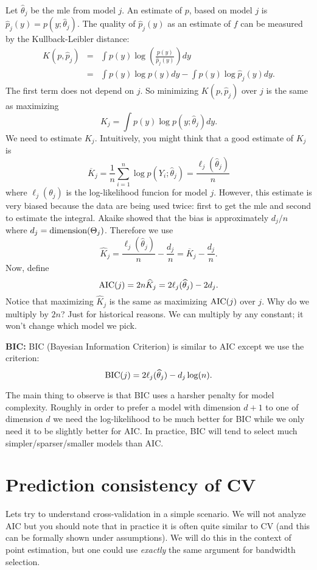 \documentclass[twoside,12pt]{article}
\begin{document}
Let $\widehat\theta_j$ be the mle from model $j$.
An estimate of $p$, based on model $j$ is
$\widehat p_j(y) = p(y;\widehat\theta_j)$.
The quality of
$\widehat p_j(y)$ as an estimate of $f$ can be measured 
by the Kullback-Leibler distance:
\begin{eqnarray*}
K(p,\widehat{p}_j) &=& \int p(y) \log \left( \frac{p(y)}{\widehat p_j(y)}\right) dy\\
&=& \int p(y) \log p(y) dy - \int p(y) \log \widehat p_j(y)  dy.
\end{eqnarray*}
The first term does not depend on $j$.
So minimizing
$K(p,\widehat{p}_j)$ over $j$ is the same as maximizing
$$
K_j = \int p(y) \log p(y;\widehat\theta_j)  dy.
$$
We need to estimate $K_j$.
Intuitively, you might think that a good estimate of $K_j$ is
$$
\overline{K}_j = \frac{1}{n}\sum_{i=1}^n  \log p(Y_i;\widehat\theta_j)  = \frac{\ell_j(\widehat\theta_j)}{n}
$$
where
$\ell_j(\theta_j)$ is the log-likelihood funcion for model $j$.
However, this estimate is very biased because the
data are being used twice: first to get the mle and second to estimate the integral.
Akaike showed that the bias is approximately 
$d_j/n$ where
$d_j = {\rm dimension}(\Theta_j)$.
Therefore we use
$$
\widehat K_j = \frac{\ell_j(\widehat\theta_j)}{n} - \frac{d_j}{n} = \overline{K}_j - \frac{d_j}{n}.
$$
Now, define
$$
{\rm AIC}(j) = 2n \widehat K_j = 2\ell_j(\widehat\theta_j) -  2 d_j.
$$
Notice that maximizing $\widehat K_j$ is the same as maximizing
${\rm AIC}(j)$ over $j$.
Why do we multiply by $2n$?
Just for historical reasons.
We can multiply by any constant; it won't change which model we pick.

{\bf BIC: } BIC (Bayesian Information Criterion) is similar to AIC except we use the criterion:
$$
{\rm BIC}(j) = 2 \ell_j(\widehat\theta_j) -  d_j \log (n).
$$

The main thing to observe is that BIC uses a harsher penalty for model complexity. Roughly in order to prefer a model with dimension $d+1$ to one of dimension $d$ we need the log-likelihood to be much better for BIC while we only need it to be slightly better for AIC. In practice, BIC will tend to select much simpler/sparser/smaller models than AIC.

\section{Prediction consistency of CV}
Lets try to understand cross-validation in a simple scenario. We will not analyze AIC but you should note that in practice it is often quite similar to CV (and this can be formally shown under assumptions).
We will do this in the context of point estimation, but one could use \emph{exactly} the same argument for bandwidth selection.
\end{document}
